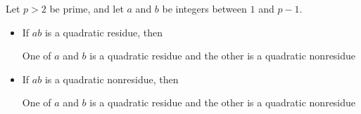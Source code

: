 \documentclass{ximera}
\theoremstyle{plain}
\theoremstyle{definition}
\begin{document}
\begin{question}
Let $p>2$ be prime, and let $a$ and $b$ be integers between $1$ and $p-1$.
\begin{itemize}
\item If $ab$ is a quadratic residue, then
\begin{selectAll}
\choice
{One of $a$ and $b$ is a quadratic residue and the other is a quadratic nonresidue}
\end{selectAll}
 \item If $ab$ is a quadratic nonresidue, then
\begin{selectAll}
\choice
{One of $a$ and $b$ is a quadratic residue and the other is a quadratic nonresidue}
\end{selectAll}
\end{itemize}
 
\end{question}
\end{document}
